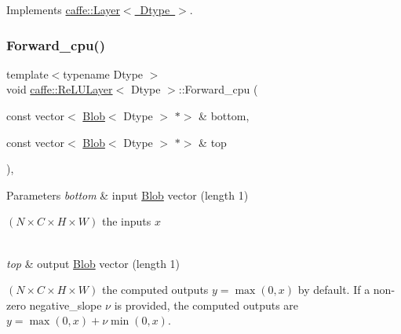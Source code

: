 Implements \mbox{\hyperlink{classcaffe_1_1_layer_a75c9b2a321dc713e0eaef530d02dc37f}{caffe\+::\+Layer$<$ Dtype $>$}}.

\mbox{\label{classcaffe_1_1_re_l_u_layer_ab9c29de12e2fac75843fe97f16fe14ba}} 
\subsubsection{\texorpdfstring{Forward\+\_\+cpu()}{Forward\_cpu()}\hspace{0.1cm}{\footnotesize\ttfamily [1/2]}}
{\footnotesize\ttfamily template$<$typename Dtype $>$ \\
void \mbox{\hyperlink{classcaffe_1_1_re_l_u_layer}{caffe\+::\+Re\+L\+U\+Layer}}$<$ Dtype $>$\+::Forward\+\_\+cpu (\begin{DoxyParamCaption}\item[{const vector$<$ \mbox{\hyperlink{classcaffe_1_1_blob}{Blob}}$<$ Dtype $>$ $\ast$$>$ \&}]{bottom,  }\item[{const vector$<$ \mbox{\hyperlink{classcaffe_1_1_blob}{Blob}}$<$ Dtype $>$ $\ast$$>$ \&}]{top }\end{DoxyParamCaption})\hspace{0.3cm}{\ttfamily [protected]}, {\ttfamily [virtual]}}


\begin{DoxyParams}{Parameters}
{\em bottom} & input \mbox{\hyperlink{classcaffe_1_1_blob}{Blob}} vector (length 1)
\begin{DoxyEnumerate}
\item $ (N \times C \times H \times W) $ the inputs $ x $ 
\end{DoxyEnumerate}\\
\hline
{\em top} & output \mbox{\hyperlink{classcaffe_1_1_blob}{Blob}} vector (length 1)
\begin{DoxyEnumerate}
\item $ (N \times C \times H \times W) $ the computed outputs $ y = \max(0, x) $ by default. If a non-\/zero negative\+\_\+slope $ \nu $ is provided, the computed outputs are $ y = \max(0, x) + \nu \min(0, x) $. 
\end{DoxyEnumerate}\\
\hline
\end{DoxyParams}


